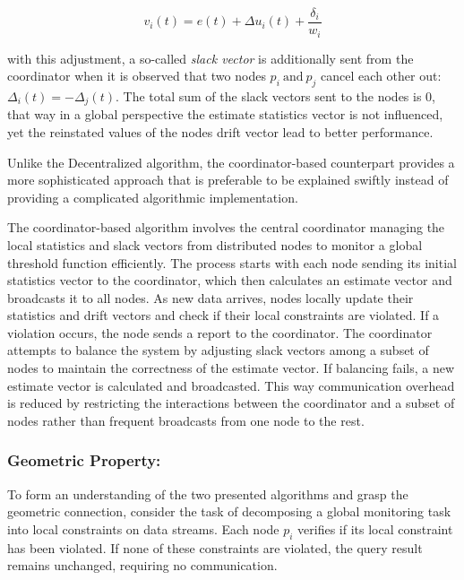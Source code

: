 \begin{equation}
    \label{eq:drift_vector_coordinator}
    v_i(t) = e(t) + \Delta u_i(t) + \frac{\delta_i}{w_i}
\end{equation}

\noindent
with this adjustment, a so-called \emph{slack vector} is additionally sent from the coordinator when it is observed
that two nodes $p_i\ \text{and}\ p_j$ cancel each other out: $\Delta_i(t) = - \Delta_j(t)$. The total sum of the slack vectors
sent to the nodes is 0, that way in a global perspective the estimate statistics vector is not influenced, yet the
reinstated values of the nodes drift vector lead to better performance.

Unlike the Decentralized algorithm, the coordinator-based counterpart provides a more sophisticated approach that is preferable
to be explained swiftly instead of providing a complicated algorithmic implementation.

The coordinator-based algorithm involves the central coordinator managing the local statistics and slack vectors from distributed
nodes to monitor a global threshold function efficiently. The process starts with each node sending its initial statistics vector to the
coordinator, which then calculates an estimate vector and broadcasts it to all nodes. As new data arrives, nodes locally update their statistics
and drift vectors and check if their local constraints are violated. If a violation occurs, the node sends a report to the coordinator. The
coordinator attempts to balance the system by adjusting slack vectors among a subset of nodes to maintain the correctness of the estimate vector.
If balancing fails, a new estimate vector is calculated and broadcasted. This way communication overhead is reduced by restricting the interactions
between the coordinator and a subset of nodes rather than frequent broadcasts from one node to the rest.

\subsubsection{Geometric Property:}
To form an understanding of the two presented algorithms and grasp the geometric connection, consider the task of decomposing a global
monitoring task into local constraints on data streams. Each node \( p_i \) verifies
if its local constraint has been violated. If none of these constraints are violated, the query result remains unchanged, requiring
no communication.


